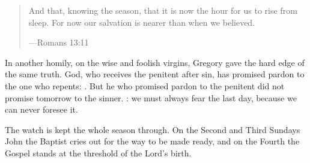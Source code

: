 \begin{quote}
And that, knowing the season, that it is now the hour for us to rise from sleep.
For now our salvation is nearer than when we believed.\par
{\smallskip\noindent\small ---Romans 13:11\par}
\end{quote}

In another homily, on the wise and foolish virgins, Gregory gave the hard edge
of the same truth. God, who receives the penitent after sin, has promised
pardon to the one who repents: . But he who promised pardon to the
penitent did not promise tomorrow to the sinner. : we must always fear the last
day, because we can never foresee it.

The watch is kept the whole season through. On the Second and Third Sundays
John the Baptist cries out for the way to be made ready, and on the Fourth the
Gospel stands at the threshold of the Lord's birth.
